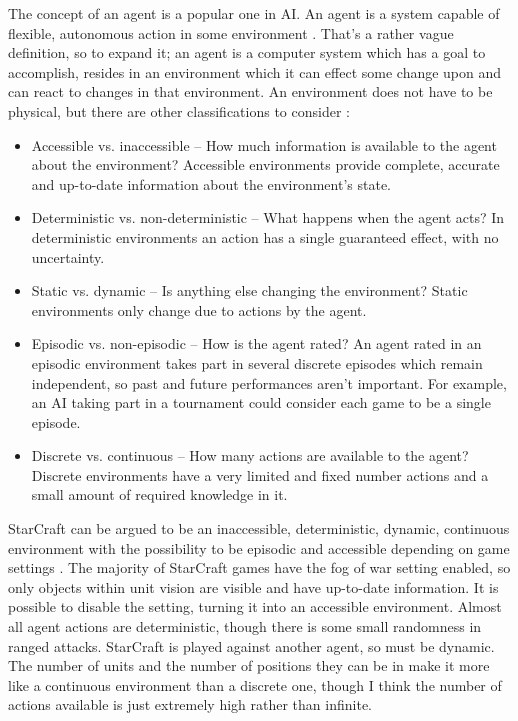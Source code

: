 \documentclass[11pt,openright,a4paper]{report}
\begin{document}
The concept of an agent is a popular one in AI. An agent is a system capable of flexible, autonomous action in some environment \cite{wooldridge1995intelligent}. That's a rather vague definition, so to expand it; an agent is a computer system which has a goal to accomplish, resides in an environment which it can effect some change upon and can react to changes in that environment. An environment does not have to be physical, but there are other classifications to consider \cite{russell1995artificial}:
\begin{itemize}
\item{Accessible vs. inaccessible – How much information is available to the agent about the environment? Accessible environments provide complete, accurate and up-to-date information about the environment's state. }
\item{Deterministic vs. non-deterministic – What happens when the agent acts? In deterministic environments an action has a single guaranteed effect, with no uncertainty. }
\item{Static vs. dynamic – Is anything else changing the environment? Static environments only change due to actions by the agent.}
\item{Episodic vs. non-episodic – How is the agent rated? An agent rated in an episodic environment takes part in several discrete episodes which remain independent, so past and future performances aren't important.  For example, an AI taking part in a tournament could consider each game to be a single episode.}
\item{Discrete vs. continuous – How many actions are available to the agent? Discrete environments have a very limited and fixed number actions and a small amount of required knowledge in it.}
\end{itemize}
StarCraft can be argued to be an inaccessible, deterministic, dynamic, continuous environment with the possibility to be episodic and accessible depending on game settings \cite{davies2012}. The majority of StarCraft games have the fog of war setting enabled, so only objects within unit vision are visible and have up-to-date information. It is possible to disable the setting, turning it into an accessible environment. Almost all agent actions are deterministic, though there is some small randomness in ranged attacks. StarCraft is played against another agent, so must be dynamic. The number of units and the number of positions they can be in make it more like a continuous environment than a discrete one, though I think the number of actions available is just extremely high rather than infinite.
\end{document}
